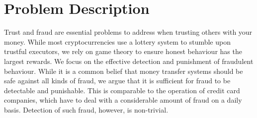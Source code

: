 


\section{Problem Description}
Trust and fraud are essential problems to address when trusting others with your money. %
While most cryptocurrencies use a lottery system to stumble upon trustful executors, we rely on game theory to ensure honest behaviour has the largest rewards.
We focus on the effective detection and punishment of fraudulent behaviour.
While it is a common belief that money transfer systems should be safe against all kinds of fraud, we argue that it is sufficient for fraud to be detectable and punishable.
This is comparable to the operation of credit card companies, which have to deal with a considerable amount of fraud on a daily basis.
Detection of such fraud, however, is non-trivial.

